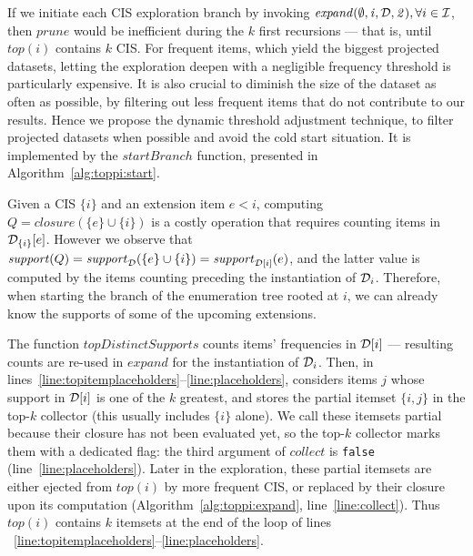 If we initiate each CIS exploration branch by invoking $\mathit{expand(\emptyset, i, {\cal D}, 2)}, \forall i \in {\cal I}$,
then $\mathit{prune}$ would be inefficient during the $k$ first recursions
--- that is, until $\mathit{top}(i)$ contains $k$ CIS.
For frequent items, which yield the biggest projected datasets,
letting the exploration deepen with a negligible frequency threshold is particularly expensive.
It is also crucial to diminish the size of the dataset as often as possible,
by filtering out less frequent items that do not contribute to our results.
Hence we propose the dynamic threshold adjustment technique,
to filter projected datasets when possible and avoid the cold start situation.
It is implemented by the $\mathit{startBranch}$ function, presented in Algorithm~\ref{alg:toppi:start}.



Given a CIS $\{i\}$ and an extension item $e < i$,
computing $Q=\mathit{closure}(\{e\} \cup \{i\})$ is a costly operation
that requires counting items in ${\cal D}_{\{i\}}[e]$.
However we observe that $\mathit{support}(Q) = \mathit{support}_{\cal D}(\{e\} \cup \{i\}) = \mathit{support}_{{\cal D}[i]}(e)$,
and the latter value is computed by the items counting
preceding the instantiation of ${\cal D}_{i}$.
Therefore, when starting the branch of the enumeration tree rooted at $i$,
we can already know the supports of some of the upcoming extensions.

The function $\mathit{topDistinctSupports}$ counts items' frequencies in ${\cal D}[i]$ ---
resulting counts are re-used in $\mathit{expand}$ for the instantiation of ${\cal D}_{i}$.
Then, in lines~\ref{line:topitemplaceholders}--\ref{line:placeholders},
\toppi considers items $j$ whose support in ${\cal D}[i]$ is one of the $k$ greatest,
and stores the partial itemset $\{i,j\}$ in the top-$k$ collector (this usually includes $\{i\}$ alone).
We call these itemsets partial because their closure has not been evaluated yet,
so the top-$k$ collector marks them with a dedicated flag:
the third argument of $\mathit{collect}$ is \verb|false| (line~\ref{line:placeholders}).
Later in the exploration,
these partial itemsets are either ejected from $\mathit{top(i)}$ by more frequent CIS,
or replaced by their closure upon its computation (Algorithm~\ref{alg:toppi:expand}, line~\ref{line:collect}).
Thus $\mathit{top(i)}$ contains $k$ itemsets at the end of the loop of lines ~\ref{line:topitemplaceholders}--\ref{line:placeholders}.

